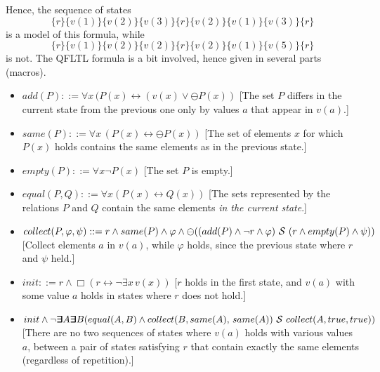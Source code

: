\documentclass{llncs}
\newcommand{\Exists}{\bm{\exists}\kern-0.6em\bm{\exists}}
\begin{document}

Hence, the sequence of states 
\[ \{ r \} \{ v(1) \}  \{ v(2) \} \{ v(3) \}  \{ r\}  \{ v(2) \}  \{  v(1) \}  \{  v(3) \} \{  r \} \] is a model of this formula, while \[ \{ r \} \{ v(1) \}  \{ v(2) \}  \{ v(2) \}  \{ r\}  \{ v(2) \}  \{  v(1) \}  \{  v(5) \}  \{  r \}\] is not.
The QFLTL formula is a bit involved, hence given in several parts (macros).

\begin{itemize}
\item $add(P) ::= \forall x \, (P(x) \leftrightarrow (v(x) \vee \ominus P(x))$ [The set $P$ differs in the current state from the previous one only by values $a$ that appear in $v(a)$.]
\item $same(P) ::= \forall x \, (P(x) \leftrightarrow \ominus P(x))$ 
[The set of elements $x$ for which
$P (x)$ holds
contains the same elements as in the previous state.]
\item $empty (P) ::= \forall x \neg P(x)$ [The set $P$ is empty.]
\item $equal (P,Q) ::= \forall x (P(x) \leftrightarrow Q(x))$ 
[The sets represented by the relations
$P$ and $Q$ contain the same elements {\em in the current state}.]
\item $collect(P, \varphi, \psi) ::=
       r \wedge same(P) \wedge \varphi \wedge 
       \ominus ((add(P)\wedge \neg r \wedge \varphi) \ {\cal S} \ (r \wedge empty(P) \wedge \psi))$  [Collect elements $a$ in $v(a)$, while $\varphi$ holds, 
       since the previous state where $r$ 
       and $\psi$ held.]
\item $init ::= r \wedge \Box (r \leftrightarrow \neg \exists x \, v(x))$ [$r$ holds in the first state, and $v(a)$ with some value $a$ holds in states where $r$ does not hold.]
\item $init \wedge \neg \Exists A \Exists B (equal (A, B) \wedge \\
collect(B, same(A),\, same(A)) \ \since \ collect(A, true, true))$
[There are no two sequences of states where $v(a)$ holds
with various values $a$, between a pair of states satisfying $r$ that contain exactly the same elements (regardless of repetition).]
\end{itemize}


\end{document}
